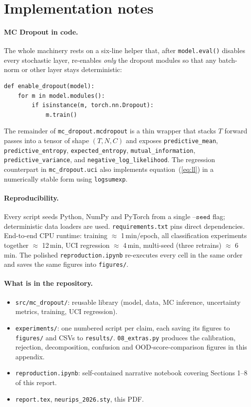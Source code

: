 \documentclass{article}
\begin{document}
\section{Implementation notes}\label{app:implementation}

\paragraph{MC Dropout in code.} The whole machinery rests on a six-line helper that, after \texttt{model.eval()} disables every stochastic layer, re-enables \emph{only} the dropout modules so that any batch-norm or other layer stays deterministic:
\begin{verbatim}
def enable_dropout(model):
    for m in model.modules():
        if isinstance(m, torch.nn.Dropout):
            m.train()
\end{verbatim}
The remainder of \texttt{mc\_dropout.mcdropout} is a thin wrapper that stacks $T$ forward passes into a tensor of shape $(T, N, C)$ and exposes \texttt{predictive\_mean}, \texttt{predictive\_entropy}, \texttt{expected\_entropy}, \texttt{mutual\_information}, \texttt{predictive\_variance}, and \texttt{negative\_log\_likelihood}. The regression counterpart in \texttt{mc\_dropout.uci} also implements equation~(\ref{eq:ll}) in a numerically stable form using \texttt{logsumexp}.

\paragraph{Reproducibility.} Every script seeds Python, NumPy and PyTorch from a single $\texttt{--seed}$ flag; deterministic data loaders are used. \texttt{requirements.txt} pins direct dependencies. End-to-end CPU runtime: training $\approx$ 1\,min/epoch, all classification experiments together $\approx$ 12\,min, UCI regression $\approx$ 4\,min, multi-seed (three retrains) $\approx$ 6\,min. The polished \texttt{reproduction.ipynb} re-executes every cell in the same order and saves the same figures into \texttt{figures/}.

\paragraph{What is in the repository.}
\begin{itemize}
\item \texttt{src/mc\_dropout/}: reusable library (model, data, MC inference, uncertainty metrics, training, UCI regression).
\item \texttt{experiments/}: one numbered script per claim, each saving its figures to \texttt{figures/} and CSVs to \texttt{results/}. \texttt{08\_extras.py} produces the calibration, rejection, decomposition, confusion and OOD-score-comparison figures in this appendix.
\item \texttt{reproduction.ipynb}: self-contained narrative notebook covering Sections 1--8 of this report.
\item \texttt{report.tex}, \texttt{neurips\_2026.sty}, this PDF.
\end{itemize}
\end{document}

